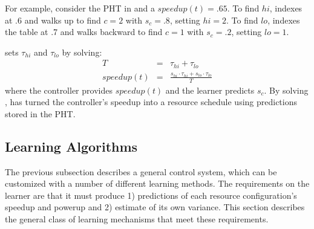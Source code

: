 For example, consider the PHT in  and a $speedup(t) =
.65$.  To find $hi$, \SYSTEM{} indexes at .6 and walks up to find
$c=2$ with $s_c=.8$, setting $hi = 2$.  To find $lo$, \SYSTEM{}
indexes the table at .7 and walks backward to find $c=1$ with
$s_c=.2$, setting $lo = 1$.

\SYSTEM{} sets $\tau_{hi}$ and $\tau_{lo}$ by solving:
\begin{eqnarray}
  T &=& \tau_{hi} + \tau_{lo}    \label{eqn:s1} \\
  speedup(t) &=& \frac{s_{hi} \cdot \tau_{hi} + s_{lo} \cdot \tau_{lo}}{T} \label{eqn:s2}
\end{eqnarray}
where the controller provides $speedup(t)$ and the learner predicts
$s_c$.  By solving , \SYSTEM{} has turned the
controller's speedup into a resource schedule using predictions stored
in the PHT.

\subsection{\SYSTEM{} Learning Algorithms}
The previous subsection describes a general control system, which can
be customized with a number of different learning methods.  The
requirements on the learner are that it must produce 1) predictions of
each resource configuration's speedup and powerup and 2) estimate of
its own variance.
This section describes the general class of learning mechanisms that
meet these requirements. 


